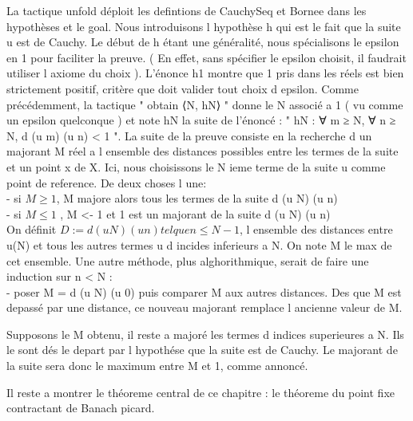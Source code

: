 \documentclass[a4paper, 12pt]{article}
\begin{document}
La tactique unfold déploit les defintions de CauchySeq et Bornee dans les hypothèses et le goal. 
Nous introduisons l hypothèse h qui est le fait que la suite u est de Cauchy. Le début de h étant une généralité, nous spécialisons le epsilon en 1 pour faciliter la preuve.  ( En effet, sans spécifier le epsilon choisit, il faudrait utiliser l axiome du choix  ). L'énonce h1 montre que 1 pris dans les réels est bien strictement positif, critère que doit valider tout choix d epsilon. Comme précédemment, la tactique  " obtain ⟨N, hN⟩ " donne le N associé a 1 ( vu comme un epsilon quelconque ) et note hN la suite de l'énoncé : " hN : ∀ m ≥ N, ∀ n ≥ N, d (u m) (u n) < 1 ". La suite de la preuve consiste en la recherche d un majorant M réel a l ensemble des distances possibles entre les termes de la suite et un point x de X. Ici, nous choisissons le N ieme terme de la suite u comme point de reference.
De deux choses l une: \\ 

        - si $M \geq 1$, M majore alors tous les termes de la suite d (u N) (u n)\\
        - si $M \leq  1$ , M <- 1 et 1 est un majorant de la suite d (u N) (u n) \\
        
On définit  \textbf{$D := { d (u N) (u n) tel que n \leq N-1 }$}, l ensemble des distances entre u(N) et tous les autres termes u d incides inferieurs a N. On note M le max de cet ensemble. 
Une autre méthode, plus alghorithmique, serait de faire une induction sur n < N : \\
        - poser M = d (u N) (u 0) puis comparer M aux autres distances. Des que M est depassé par une distance, ce nouveau majorant remplace l ancienne valeur de M. 

Supposons le M obtenu, il reste a majoré les termes d indices superieures a N. Ils le sont dés le depart par l hypothése que la suite est de Cauchy. 
Le majorant de la suite sera donc le maximum entre M et 1, comme annoncé.


Il reste a montrer le théoreme central de ce chapitre : le théoreme du point fixe contractant de Banach picard.
\end{document}
